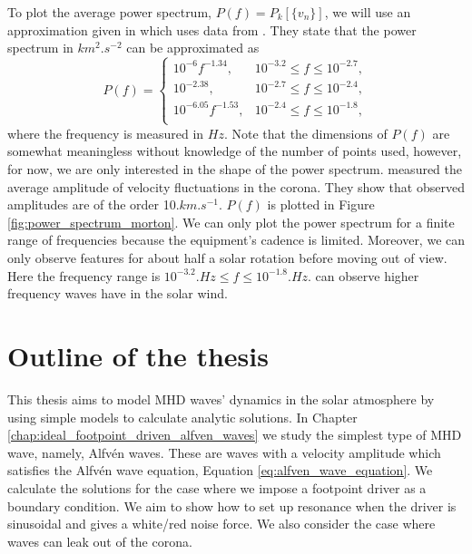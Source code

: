To plot the average power spectrum, $P(f)=P_k[\{v_n\}]$, we will use an approximation given in \citet{Pagano2019} which uses data from \citet{Morton2016}. They state that the power spectrum in $\si{km^2.s^{-2}}$ can be approximated as
\begin{equation}
    P(f) = \begin{cases}
    10^{-6}f^{-1.34},     & 10^{-3.2} \le f \le 10^{-2.7}, \\
    10^{-2.38},           & 10^{-2.7} \le f \le 10^{-2.4}, \\
    10^{-6.05}f^{-1.53}, & 10^{-2.4} \le f \le 10^{-1.8}, \\
    \end{cases}
\end{equation}
where the frequency is measured in $\si{Hz}$. 
Note that the dimensions of $P(f)$ are somewhat meaningless without knowledge of the number of points used, however, for now, we are only interested in the shape of the power spectrum. \cite{McIntosh2011,McIntosh2012}  measured the average amplitude of velocity fluctuations in the corona. They show that observed amplitudes are of the order 10$\si{.km.s^{-1}}$. $P(f)$ is plotted in Figure \ref{fig:power_spectrum_morton}. We can only plot the power spectrum for a finite range of frequencies because the equipment’s cadence is limited. Moreover, we can only observe features for about half a solar rotation before moving out of view. Here the frequency range is $10^{-3.2}\si{.Hz} \le f \le 10^{-1.8}\si{.Hz}$. \citet{Podesta2007} can observe higher frequency waves have in the solar wind.

\section{Outline of the thesis}

This thesis aims to model MHD waves' dynamics in the solar atmosphere by using simple models to calculate analytic solutions. In Chapter \ref{chap:ideal_footpoint_driven_alfven_waves} we study the simplest type of MHD wave, namely, Alfv\'en waves. These are waves with a velocity amplitude which satisfies the Alfv\'en wave equation, Equation \eqref{eq:alfven_wave_equation}. We calculate the solutions for the case where we impose a footpoint driver as a boundary condition. We aim to show how to set up resonance when the driver is sinusoidal and gives a white/red noise force. We also consider the case where waves can leak out of the corona.

